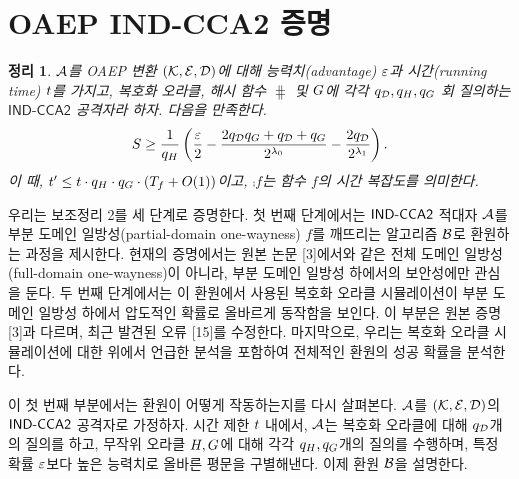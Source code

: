 \documentclass{article}
\newtheorem{theorem}{정리}
\begin{document}
\section{OAEP IND-CCA2 증명}

\begin{theorem}
	$\mathcal{A}$를 OAEP 변환 $(\mathcal{K}, \mathcal{E}, \mathcal{D})$에 대해 능력치(advantage)
	$\varepsilon$과 시간(running time) $t$를 가지고, 복호화 오라클, 해시 함수
	$\hash$ 및 $G$에 각각 $q_{\mathcal{D}}, q_{H}, q_{G}$ 회
	질의하는 $\textsf{IND-CCA2}$ 공격자라 하자. 다음을 만족한다.
	$$
    S \ge \frac{1}{q_{H}} \left(
      \frac{\varepsilon}{2}
       - \frac{2q_{\mathcal{D}}q_{G} + q_{\mathcal{D}} + q_{G}}{2^{\lambda_0}}
       - \frac{2q_{\mathcal{D}}}{2^{\lambda_1}}
    \right).
	$$
  이 때, $t' \le t \cdot q_{H} \cdot q_{G} \cdot (T_{f} +
   O(1))$이고, $\comp{f}$는 함수 $f$의 시간 복잡도를 의미한다.
\end{theorem}



우리는 보조정리 2를 세 단계로 증명한다. 첫 번째 단계에서는 $\textsf{IND-CCA2}$ 적대자
$\mathcal{A}$를 부분 도메인 일방성(partial-domain one-wayness) $f$를 깨뜨리는 알고리즘
$\mathcal{B}$로 환원하는 과정을 제시한다. 현재의 증명에서는 원본 논문 [3]에서와 같은
전체 도메인 일방성(full-domain one-wayness)이 아니라, 부분 도메인 일방성
하에서의 보안성에만 관심을 둔다. 두 번째 단계에서는 이 환원에서 사용된 복호화
오라클 시뮬레이션이 부분 도메인 일방성 하에서 압도적인 확률로 올바르게 동작함을
보인다. 이 부분은 원본 증명 [3]과 다르며, 최근 발견된 오류 [15]를 수정한다.
마지막으로, 우리는 복호화 오라클 시뮬레이션에 대한 위에서 언급한 분석을 포함하여
전체적인 환원의 성공 확률을 분석한다.

이 첫 번째 부분에서는 환원이 어떻게 작동하는지를 다시 살펴본다. $\mathcal{A}$를
$(\mathcal{K}, \mathcal{E}, \mathcal{D})$의 $\textsf{IND-CCA2}$ 공격자로 가정하자. 시간 제한 $t$ 내에서,
$\mathcal{A}$는 복호화 오라클에 대해 $q_{\mathcal{D}}$개의 질의를 하고, 무작위 오라클 $H,
G$에 대해 각각 $q_{H}, q_{G}$개의 질의를 수행하며, 특정 확률
$\varepsilon$보다 높은 능력치로 올바른 평문을 구별해낸다. 이제 환원 $\mathcal{B}$을 설명한다.
\end{document}
